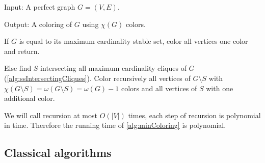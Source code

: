 \begin{alg}
  \label{alg:minColoring}
  Input: A perfect graph $G = (V, E)$.

  \noindent Output: A coloring of $G$ using $\chi(G)$ colors.
\end{alg}
\begin{algtext}
  If $G$ is equal to its maximum cardinality stable set, color all vertices one color and return.

  Else find $S$ intersecting all maximum cardinality cliques of $G$ (\cref{alg:ssIntersectingCliques}). Color recursively all vertices of $G \setminus S$ with $\chi(G \setminus S) = \omega(G \setminus S) = \omega(G) -1$ colors and all vertices of $S$ with one additional color.
\end{algtext}

We will call recursion at most $O(|V|)$ times, each step of recursion is polynomial in time. Therefore the running time of \cref{alg:minColoring} is polynomial.

\subsection{Classical algorithms}
\label{sec:classicalColoring}